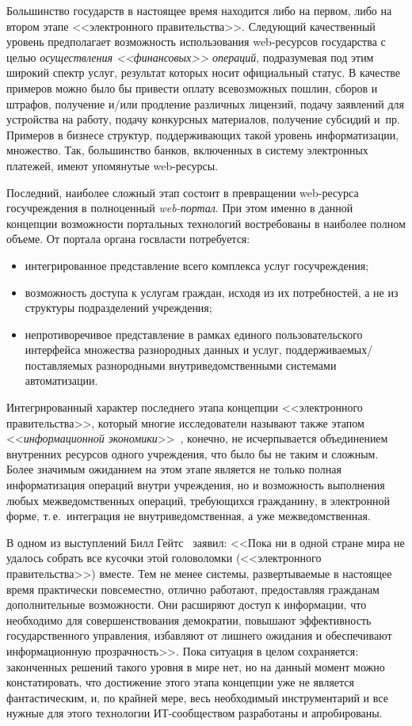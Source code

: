 \begin{multicols}{2}
Большинство государств в настоящее время находится либо на первом, либо на втором
этапе <<электронного правительства>>. Следующий качественный уровень предполагает
возможность использования web-ресурсов государства с целью \textit{осуществления
<<финансовых>> операций}, подразумевая под этим широкий спектр услуг, результат
которых носит официальный статус. В качестве примеров можно было бы привести
оплату всевозможных пошлин, сборов и штрафов, получение и/или продление различных
лицензий, подачу заявлений для устройства на работу, подачу конкурсных материалов,
получение субсидий и~пр. Примеров в бизнесе структур, поддерживающих такой
уровень информатизации, множество. Так, большинство банков, включенных в систему
электронных платежей, имеют упомянутые web-ресурсы.

Последний, наиболее сложный этап состоит в превращении web-ресурса госучреждения в
полноценный \textit{web-портал}. При этом именно в данной концепции возможности
портальных технологий востребованы в наиболее полном объеме. От портала органа
госвласти потребуется:
\begin{itemize}
\item интегрированное представление всего комплекса услуг госучреждения;
\item возможность доступа к услугам граждан, исходя из их потребностей, а не из
структуры подразделений учреждения;
\item непротиворечивое представление в рамках едино\-го пользовательского
интерфейса множества разнородных данных и услуг, под\-дер\-жи\-ва\-е\-мых/по\-став\-ля\-е\-мых
разнородными внутриведомственными системами автоматизации.
\end{itemize}

Интегрированный характер последнего этапа концепции <<электронного правительства>>,
который многие исследователи называют также этапом <<\textit{информационной
экономики}>>~\cite{2bos}, конечно, не исчерпывается объединением внутренних ресурсов
одного учреждения, что было бы не таким и сложным. Более значимым ожиданием на
этом этапе является не только полная информатизация операций внутри учреждения, но и
возможность выполнения любых межведомственных операций, требующихся
гражданину, в электронной форме, т.\,е.\ интеграция не внутриведомственная, а уже
межведомственная.

В одном из выступлений Билл Гейтс~\cite{2bos} заявил: <<Пока ни в одной стране мира
не удалось собрать все кусочки этой головоломки (<<электронного правительства>>)
вместе. Тем не менее системы, развертываемые в настоящее время практически
повсеместно, отлично работают, предоставляя гражданам дополнительные возможности.
Они расширяют доступ к информации, что необходимо для совершенствования
демократии, повышают эффективность государственного управления, избавляют от
лишнего ожидания и обеспечивают информационную прозрачность>>. Пока ситуация в
целом сохраняется: законченных решений такого уровня в мире нет, но на данный момент
можно констатировать, что достижение этого этапа концепции уже не является
фантастическим, и, по крайней мере, весь необходимый инструментарий и все нужные
для этого технологии ИТ-сообществом разработаны и апробированы.


\end{multicols}
